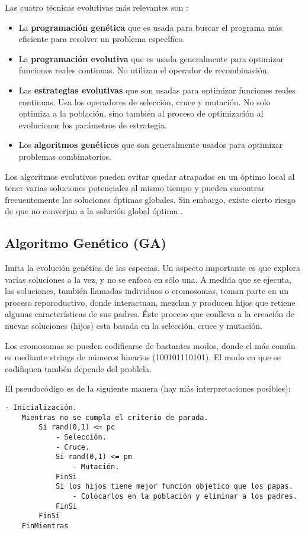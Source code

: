     Las cuatro técnicas evolutivas más relevantes son \cite{PSO_0}:
\begin{itemize}
    \item La \textbf{programación genética} que es usada para buscar el
programa más eficiente para resolver un problema específico.
    \item La \textbf{programación evolutiva} que es usada generalmente para
optimizar funciones reales continuas. No utilizan el operador de recombinación.
    \item Las \textbf{estrategias evolutivas} que son usadas para optimizar
funciones reales continuas. Usa los operadores de selección, cruce y mutación.
No solo optimiza a la población, sino también al proceso de optimización al
evolucionar los parámetros de estrategia.
    \item Los \textbf{algoritmos genéticos} que son generalmente usados para
optimizar problemas combinatorios.
\end{itemize}

    Los algoritmos evolutivos pueden evitar quedar atrapados en un óptimo local
al tener varias soluciones potenciales al mismo tiempo y pueden encontrar
frecuentemente las soluciones óptimas globales. Sin embargo, existe cierto
riesgo de que no converjan a la solución global óptima \cite{SA_4}.

\subsection{Algoritmo Genético (GA)}

Imita la evoluci\'on gen\'etica de las especias. Un aspecto importante es que
explora varias soluciones a la vez, y no se enfoca en s\'olo una. A medida que
se ejecuta, las soluciones, tambi\'en llamadas individuos o cromosomas, 
toman parte en un proceso reporoductivo, donde interactuan, mezclan y producen
hijos que retiene algunas caracter\'isticas de sus padres. \'Este proceso
que conlleva a la creaci\'on de nuevas soluciones (hijos) esta basada en
la selecci\'on, cruce y mutaci\'on\cite{DoGeGr2007}.

Los cromosomas se pueden codificarse de bastantes modos, donde el m\'as 
com\'un es mediante strings de n\'umeros binarios (100101110101). El modo en
que se codifiquen tamb\'en depende del problela.


El pseudoc\'odigo es de la siguiente manera (hay m\'as interpretaciones posibles):

\begin{lstlisting}[float=h, caption=Algoritmo General Genetico]
    - Inicialización.
    Mientras no se cumpla el criterio de parada.
        Si rand(0,1) <= pc
            - Selección.
            - Cruce.
            Si rand(0,1) <= pm
                - Mutación.
            FinSi
            Si los hijos tiene mejor función objetico que los papas.
                - Colocarlos en la población y eliminar a los padres.
            FinSi
        FinSi
    FinMientras
\end{lstlisting}

